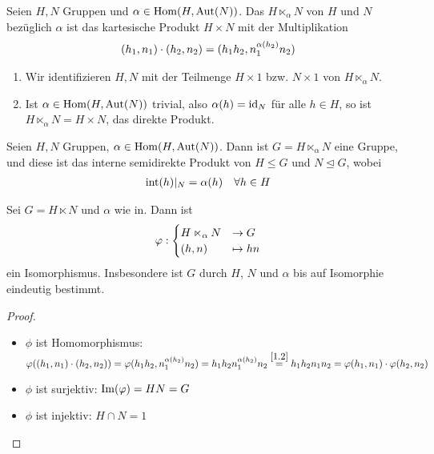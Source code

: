 \begin{definition}
	Seien $H,N$ Gruppen und $\alpha\in\Hom(H,\Aut(N))$. Das  $H\ltimes_{\alpha}N$ von $H$ und $N$ bezüglich $\alpha$ ist das kartesische Produkt $H\times N$ mit der Multiplikation
	\begin{align}
		(h_1,n_1)\cdot (h_2,n_2) = (h_1h_2,n_1^{\alpha(h_2)}n_2)\notag
	\end{align}
\end{definition}

\begin{remark}
	\begin{enumerate}[label=(\alph*)]
		\item Wir identifizieren $H,N$ mit der Teilmenge $H\times 1$ bzw. $N\times 1$ von $H\ltimes_{\alpha} N$.
		\item Ist $\alpha\in\Hom(H,\Aut(N))$ trivial, also $\alpha(h)=\id_N$ für alle $h\in H$, so ist $H\ltimes_{\alpha} N=H \times N$, das direkte Produkt.
	\end{enumerate}
\end{remark}

\begin{proposition}
	Seien $H,N$ Gruppen, $\alpha\in\Hom(H,\Aut(N))$. Dann ist $G=H\ltimes_{\alpha} N$ eine Gruppe, und diese ist das interne semidirekte Produkt von $H\le G$ und $N\unlhd G$, wobei
	\begin{align}
		\Int(h)\vert_N = \alpha(h)\quad\forall h\in H\notag
	\end{align}
\end{proposition}

\begin{conclusion}
	Sei $G=H\ltimes N$ und $\alpha$ wie in. Dann ist
	\begin{align}
		\phi :\begin{cases}
		H\ltimes_{\alpha} N &\to G \\ (h,n) &\mapsto hn
		\end{cases}\notag
	\end{align}
	ein Isomorphismus. Insbesondere ist $G$ durch $H$, $N$ und $\alpha$ bis auf Isomorphie eindeutig bestimmt.
\end{conclusion}
\begin{proof}
	\begin{itemize}
		\item $\phi$ ist Homomorphismus: $\phi((h_1,n_1)\cdot (h_2,n_2)) = \phi(h_1h_2,n_1^{\alpha(h_2)}n_2) = h_1h_2n_1^{\alpha(h_2)}n_2 \overset{\cref{1.2}}{=} h_1h_2n_1n_2 = \phi(h_1,n_1)\cdot \phi(h_2,n_2)$
		\item $\phi$ ist surjektiv: $\Image(\phi)=HN=G$
		\item $\phi$ ist injektiv: $H\cap N=1$
	\end{itemize}
\end{proof}

